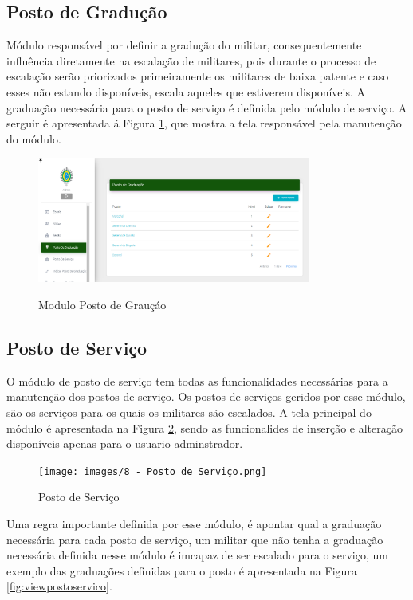 \subsection{Posto de Gradução}

Módulo responsável por definir a gradução do militar, consequentemente influência diretamente na escalação de militares, pois durante o processo de escalação serão priorizados primeiramente os militares de baixa patente e caso esses não estando disponíveis, escala aqueles que estiverem disponíveis. A graduação necessária para o posto de serviço é definida pelo módulo de serviço. A serguir é apresentada á Figura \ref{fig:postograuacao}, que mostra a tela responsável pela manutenção do módulo.


\begin{figure}[!htb]
    \centering
    \caption{Modulo Posto de Grauçáo}
    \includegraphics[width=0.8\textwidth]{images/10 - Posto de Graduacao.png}
    \label{fig:postograuacao}
\end{figure}


\subsection{Posto de Serviço}

O módulo de posto de serviço tem todas as funcionalidades necessárias para a manutenção dos postos de serviço. Os postos de serviços geridos por esse módulo, são os serviços para os quais os militares são escalados. A tela principal do módulo é apresentada na Figura \ref{fig:postoservico}, sendo as funcionalides de inserção e alteração disponíveis apenas para o usuario adminstrador.

\begin{figure}[!htb]
    \centering
    \caption{Posto de Serviço}
    \texttt{[image: images/8 - Posto de Serviço.png]}
    \label{fig:postoservico}
\end{figure}

Uma regra importante definida por esse módulo, é apontar qual a graduação necessária para cada posto de serviço, um militar que não tenha a graduação necessária definida nesse módulo é imcapaz de ser escalado para o serviço, um exemplo das graduações definidas para o posto é apresentada na Figura \ref{fig:viewpostoservico}.

